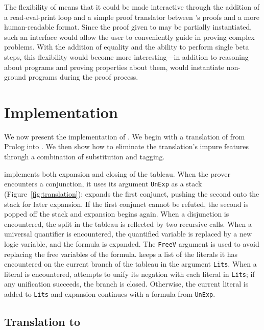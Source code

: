 The flexibility of \alphatapsp means that it could be made interactive
through the addition of a read-eval-print loop and a simple proof
translator between \alphatap's proofs and a more human-readable
format. Since the proof given to \alphatapsp may be partially
instantiated, such an interface would allow the user to conveniently
guide \alphatapsp in proving complex problems. With the addition of
equality and the ability to perform single beta steps, this
flexibility would become more interesting---in addition to reasoning
about programs and proving properties about them, \alphatapsp would
instantiate non-ground programs during the proof process.




\section{Implementation}\label{implementation}

We now present the implementation of \alphatap. We begin with a
translation of \leantapsp from Prolog into \alphakanren. We then show
how to eliminate the translation's impure features through a
combination of substitution and tagging.


\leantapsp implements both expansion and closing of the tableau. When
the prover encounters a conjunction, it uses its argument
\texttt{UnExp} as a stack (Figure~\ref{fig:translation}): \leantapsp
expands the first conjunct, pushing the second onto the stack for
later expansion. If the first conjunct cannot be refuted, the second
is popped off the stack and expansion begins again.  When a
disjunction is encountered, the split in the tableau is reflected by
two recursive calls. When a universal quantifier is encountered, the
quantified variable is replaced by a new logic variable, and the
formula is expanded.  The \texttt{FreeV} argument is used to avoid
replacing the free variables of the formula.  \leantapsp keeps a list
of the literals it has encountered on the current branch of the
tableau in the argument \texttt{Lits}.  When a literal is encountered,
\leantapsp attempts to unify its negation with each literal in
\texttt{Lits}; if any unification succeeds, the branch is closed.
Otherwise, the current literal is added to \texttt{Lits} and expansion
continues with a formula from \texttt{UnExp}.


\subsection{Translation to \alphakanren}\label{translation}

